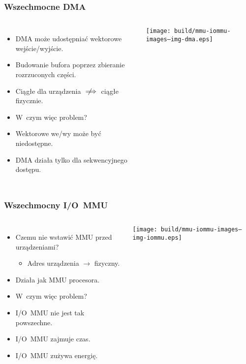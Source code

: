 \begin{frame}
  \frametitle{Wszechmocne DMA}

  \begin{columns}[c]

    \begin{itemize}
    \item DMA może udostępniać wektorowe wejście/wyjście.
    \item Budowanie bufora poprzez zbieranie rozrzuconych części.
    \item Ciągłe dla urządzenia $\notimplies$ ciągłe fizycznie.
    \item<1> W~czym więc problem?
    \item<2> Wektorowe we/wy może być niedostępne.
    \item<2> DMA działa tylko dla sekwencyjnego dostępu.
    \end{itemize}

    \begin{center}
      \texttt{[image: build/mmu-iommu-images--img-dma.eps]}
    \end{center}

  \end{columns}
\end{frame}

\begin{frame}
  \frametitle{Wszechmocny I/O~MMU}

  \begin{columns}[c]

    \begin{itemize}
    \item Czemu nie wstawić MMU przed urządzeniami?
      \begin{itemize}
      \item Adres urządzenia $\rightarrow$ fizyczny.
      \end{itemize}
    \item Działa jak MMU procesora.
    \item<1> W~czym więc problem?
    \item<2> I/O~MMU nie jest tak powszechne.
    \item<2> I/O~MMU zajmuje czas.
    \item<2> I/O~MMU zużywa energię.
    \end{itemize}

    \begin{center}
      \texttt{[image: build/mmu-iommu-images--img-iommu.eps]}
    \end{center}

  \end{columns}
\end{frame}
